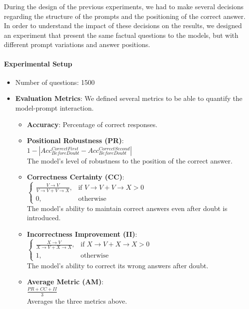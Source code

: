 During the design of the previous experiments, we had to make several decisions regarding the structure of the prompts and the positioning of the correct answer. In order to understand the impact of these decisions on the results, we designed an experiment that present the same factual questions to the models, but with different prompt variations and answer positions.

\paragraph{Experimental Setup}
\begin{itemize}
  \item Number of questions: 1500
  \item \textbf{Evaluation Metrics}:
    We defined several metrics to be able to quantify the model-prompt interaction.
    \begin{itemize}
      \item \textbf{Accuracy}: Percentage of correct responses.
      \item \textbf{Positional Robustness (PR)}: \\
        $1 - \left| Acc_{BeforeDoubt}^{CorrectFirst} - Acc_{BeforeDoubt}^{CorrectSecond} \right|$\\
        The model's level of robustness to the position of the correct answer.
      \item \textbf{Correctness Certainty (CC)}: \\
        $
        \begin{cases}
          \frac{V \to V}{V \to V + V \to X}, & \text{if } V \to V + V \to X > 0 \\
          0, & \text{otherwise}
        \end{cases}$\\
        The model's ability to maintain correct answers even after doubt is introduced.
      \item \textbf{Incorrectness Improvement (II)}: \\
        $
        \begin{cases}
          \frac{X \to V}{X \to V + X \to X}, & \text{if } X \to V + X \to X > 0 \\
          1, & \text{otherwise}
        \end{cases}$ \\
        The model's ability to correct its wrong answers after doubt.
      \item \textbf{Average Metric (AM)}: \\
        $\frac{PR + CC + II}{3}$ \\
        Averages the three metrics above.
    \end{itemize}


\end{itemize}

